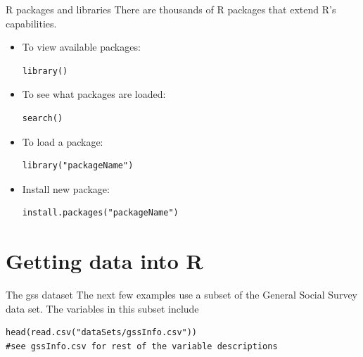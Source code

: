 \documentclass[table,smaller]{beamer}
\begin{document}
\begin{frame}[fragile,label=sec-4-2]{R packages and libraries}
 There are thousands of R packages that extend R's capabilities.

\begin{itemize}
\item To view available packages: 
\begin{verbatim}
library()
\end{verbatim}

\item To see what packages are loaded: 
\begin{verbatim}
search()
\end{verbatim}

\item To load a package: 
\begin{verbatim}
library("packageName")
\end{verbatim}

\item Install new package: 
\begin{verbatim}
install.packages("packageName")
\end{verbatim}
\end{itemize}
\end{frame}



\section{Getting data into R}
\label{sec-5}


\begin{frame}[fragile,label=sec-5-1]{The gss dataset}
 The next few examples use a subset of the General Social Survey data set. The variables in this subset include
\begin{verbatim}
head(read.csv("dataSets/gssInfo.csv")) 
#see gssInfo.csv for rest of the variable descriptions
\end{verbatim}
\end{frame}
\end{document}
